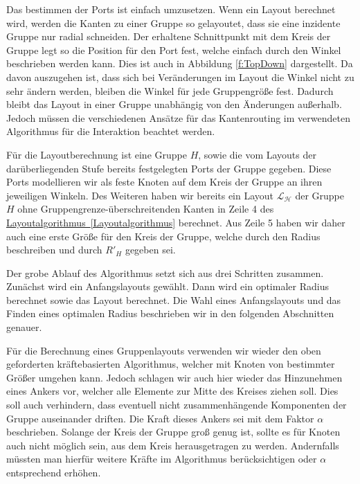 Das bestimmen der Ports ist einfach umzusetzen. 
Wenn ein Layout berechnet wird, werden die Kanten zu einer Gruppe so gelayoutet, dass sie eine inzidente Gruppe nur radial schneiden.
Der erhaltene Schnittpunkt mit dem Kreis der Gruppe legt so die Position für den Port fest, welche einfach durch den Winkel beschrieben werden kann. 
Dies ist auch in Abbildung \autoref{f:TopDown} dargestellt.
Da davon auszugehen ist, dass sich bei Veränderungen im Layout die Winkel nicht zu sehr ändern werden, bleiben die Winkel für jede Gruppengröße fest.
Dadurch bleibt das Layout in einer Gruppe unabhängig von den Änderungen außerhalb. 
Jedoch müssen die verschiedenen Ansätze für das Kantenrouting im verwendeten Algorithmus für die Interaktion beachtet werden.

Für die Layoutberechnung ist eine Gruppe $H$, sowie die vom Layouts der darüberliegenden Stufe bereits festgelegten Ports der Gruppe gegeben.
Diese Ports modellieren wir als feste Knoten auf dem Kreis der Gruppe an ihren jeweiligen Winkeln.
Des Weiteren haben wir bereits ein Layout $\mathcal{L_H}$ der Gruppe $H$ ohne Gruppengrenze-überschreitenden Kanten in Zeile 4 des \hyperref[Layoutalgorithmus]{Layoutalgorithmus~\ref*{Layoutalgorithmus}}  berechnet. 
Aus Zeile 5 haben wir daher auch eine erste Größe für den Kreis der Gruppe, welche durch den Radius beschreiben und durch $R'_H$ gegeben sei. 

Der grobe Ablauf des Algorithmus setzt sich aus drei Schritten zusammen. Zunächst wird ein Anfangslayouts gewählt.
Dann wird ein optimaler Radius  berechnet sowie das Layout berechnet. 
Die Wahl eines Anfangslayouts und das Finden eines optimalen Radius beschrieben wir in den folgenden Abschnitten genauer. 


Für die Berechnung eines Gruppenlayouts verwenden wir wieder den oben geforderten kräftebasierten Algorithmus, welcher mit Knoten von bestimmter Größer umgehen kann. 
Jedoch schlagen wir auch hier wieder das Hinzunehmen eines Ankers vor, welcher alle Elemente zur Mitte des Kreises ziehen soll.
Dies soll auch verhindern, dass eventuell nicht zusammenhängende Komponenten der Gruppe auseinander driften. 
Die Kraft dieses Ankers sei mit dem Faktor $\alpha$ beschrieben. 
Solange der Kreis der Gruppe groß genug ist, sollte es für Knoten auch nicht möglich sein, aus dem Kreis herausgetragen zu werden. 
Andernfalls müssten man hierfür weitere Kräfte im Algorithmus berücksichtigen oder $\alpha$ entsprechend erhöhen.

